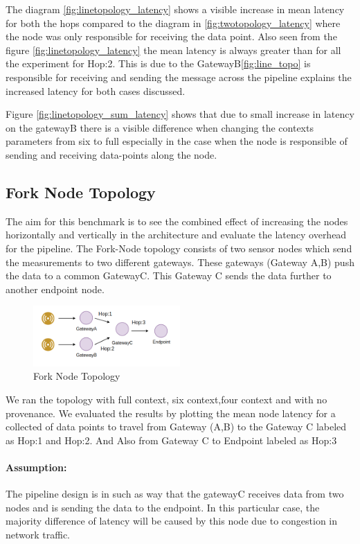 The diagram \ref{fig:linetopology_latency}  shows a visible increase in mean latency for both the hops compared to the diagram in \ref{fig:twotopology_latency} where the node was only responsible for receiving the data point. Also seen from the figure \ref{fig:linetopology_latency} the mean latency is always greater than for all the experiment for Hop:2. This is due to the GatewayB\ref{fig:line_topo} is responsible for receiving and sending the message across the pipeline explains the increased latency for both cases discussed.

Figure \ref{fig:linetopology_sum_latency} shows that due to small increase in latency on the gatewayB there is a visible difference when changing the contexts parameters from six to full especially in the case when the node is responsible of sending and receiving data-points along the node.


\subsection{Fork Node Topology}
The aim for this benchmark is to see the combined effect of increasing the nodes horizontally and vertically in the architecture and evaluate the latency overhead for the pipeline. The Fork-Node topology consists of two sensor nodes which send the measurements to two different gateways. These gateways (Gateway A,B) push the data to a common GatewayC. This Gateway C sends the data further to another endpoint node.

\begin{figure}[H]
	\center
	\includegraphics[width=0.5\textwidth]{figures/latencytopo_fork.png}
	\caption{Fork Node Topology}
	\label{fig:fork_topo}
\end{figure}

We ran the topology with full context, six context,four context and with no provenance. We evaluated the results by plotting the mean node latency for a collected of data points
to travel from Gateway (A,B) to the Gateway C labeled as Hop:1  and Hop:2. And Also from Gateway C to Endpoint labeled as Hop:3

\paragraph*{Assumption:}
The pipeline design is in such as way that the gatewayC receives data from two nodes and is sending the data to the endpoint. In this particular case, the majority difference of latency will be caused by this node due to congestion in network traffic.


